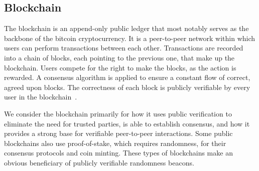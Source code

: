 \subsection{Blockchain}\label{subsec:blockchain}
The blockchain is an append-only public ledger that most notably serves as the backbone of the bitcoin cryptocurrency.
It is a peer-to-peer network within which users can perform transactions between each other.
Transactions are recorded into a chain of blocks, each pointing to the previous one, that make up the blockchain.
Users compete for the right to make the blocks, as the action is rewarded.
A consensus algorithm is applied to ensure a constant flow of correct, agreed upon blocks.
The correctness of each block is publicly verifiable by every user in the blockchain~\cite{nakamoto2008bitcoin}.

We consider the blockchain primarily for how it uses public verification to eliminate the need for trusted parties, is able to establish consensus, and how it provides a strong base for verifiable peer-to-peer interactions.
Some public blockchains also use proof-of-stake, which requires randomness, for their consensus protocols and coin minting.
These types of blockchains make an obvious beneficiary of publicly verifiable randomness beacons.
